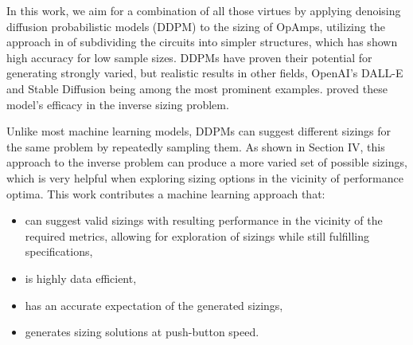 \documentclass[conference]{IEEEtran}
\begin{document}
	In this work, we aim for a combination of all those virtues by applying denoising diffusion probabilistic models (DDPM) to the sizing of OpAmps, utilizing the approach in \cite{leibl24inverse} of subdividing the circuits into simpler structures, which has shown high accuracy for low sample sizes. DDPMs have proven their potential for generating strongly varied, but realistic results in other fields, OpenAI's DALL-E and Stable Diffusion being among the most prominent examples. \cite{eid24diffusion} proved these model's efficacy in the inverse sizing problem.
	
	Unlike most machine learning models, DDPMs can suggest different sizings for the same problem by repeatedly sampling them.
	As shown in Section IV, this approach to the inverse problem can produce a more varied set of possible sizings, which is very helpful when exploring sizing options in the vicinity of performance optima. 
This work contributes a machine learning approach that:
	\begin{itemize}
	\item can suggest valid sizings with resulting performance in the vicinity of the required metrics, allowing for exploration of sizings while still fulfilling specifications,
	\item is highly data efficient,
	\item has an accurate expectation of the generated sizings,
	\item generates sizing solutions at push-button speed.
	\end{itemize}
	
\end{document}
